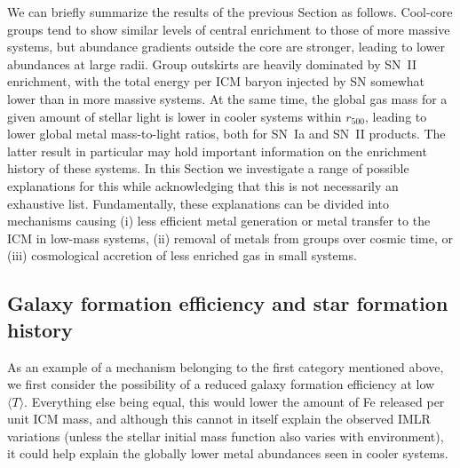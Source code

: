 \documentclass[useAMS,usenatbib]{mn2e}
\begin{document}
We can briefly summarize the results of the previous Section as
follows. Cool-core groups tend to show similar levels of central
enrichment to those of more massive systems, but abundance gradients
outside the core are stronger, leading to lower abundances at large
radii. Group outskirts are heavily dominated by SN~II enrichment, with
the total energy per ICM baryon injected by SN somewhat lower than in
more massive systems. At the same time, the global gas mass for a
given amount of stellar light is lower in cooler systems within
$r_{500}$, leading to lower global metal mass-to-light ratios, both
for SN~Ia and SN~II products. The latter result in particular may hold
important information on the enrichment history of these systems. In
this Section we investigate a range of possible explanations for this
while acknowledging that this is not necessarily an exhaustive list.
Fundamentally, these explanations can be divided into mechanisms
causing (i) less efficient metal generation or metal transfer to the
ICM in low-mass systems, (ii) removal of metals from groups over
cosmic time, or (iii) cosmological accretion of less enriched gas in
small systems.



\subsection{Galaxy formation efficiency and star formation history}
\label{sec,SFE}

As an example of a mechanism belonging to the first category mentioned
above, we first consider the possibility of a reduced galaxy formation
efficiency at low $\langle T \rangle$.  Everything else being equal,
this would lower the amount of Fe released per unit ICM mass, and
although this cannot in itself explain the observed IMLR variations
(unless the stellar initial mass function also varies with
environment), it could help explain the globally lower metal
abundances seen in cooler systems.
\end{document}
